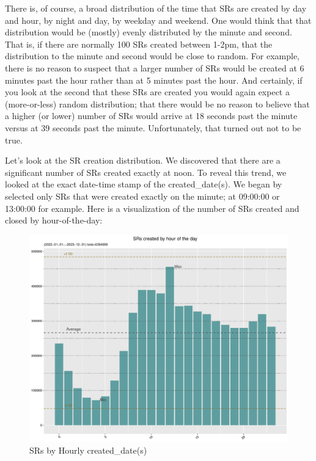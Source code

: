 \documentclass[12pt, titlepage]{article}
\begin{document}
{	There is, of course, a broad distribution of the time that SRs are created by day and hour, by night and day, by weekday and weekend. 
	One would think that that distribution would be (mostly) evenly distributed by the minute and second. That is, 
	if there are normally 100 SRs created between 1-2pm, that the distribution to the minute and second 
	would be close to random. For example, there is no reason to suspect that a larger number of SRs would be 
	created at 6 minutes past the hour rather than at 5 minutes past the hour. And certainly, if you look at the second that these SRs
	are created you would again expect a (more-or-less) random distribution; that there would be no reason to believe 
	that a higher (or lower) number of SRs would arrive at 18 seconds past the minute versus at 39 seconds past the minute.
	Unfortunately, that turned out not to be true.
	
	Let's look at the SR creation distribution. We discovered that there are a significant number of SRs created exactly at noon. To reveal this
	trend, we looked at the exact date-time stamp of the created\_date(s). We began by selected only SRs that were created exactly on the minute;
	at 09:00:00 or 13:00:00 for example.  Here is a visualization of the number of SRs created and closed by hour-of-the-day:
	
	\begin{figure}[H]
		 \centering
		 \includegraphics[width = \textwidth]{Created_Hourly_SR_count.pdf}
		 \caption{SRs by Hourly created\_date(s)}
		 \label{fig:hourly-created}
	\end{figure}	
	
}
\end{document}

